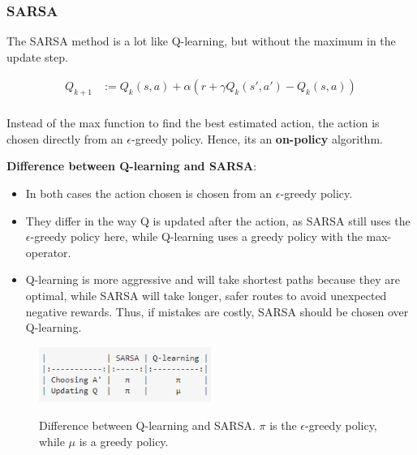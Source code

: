 \subsubsection{SARSA}

The SARSA method is a lot like Q-learning, but without the maximum in the update step.

\begin{align}
    Q_{k+1} &:= Q_k(s, a) + \alpha(r + \gamma Q_k(s', a') - Q_k(s, a)) \\
    \label{eq:qlearn}
\end{align}

Instead of the max function to find the best estimated action, the action is chosen directly from an $\epsilon$-greedy policy. Hence, its an \textbf{on-policy} algorithm.

\textbf{Difference between Q-learning and SARSA}:
\begin{itemize}
    \item In both cases the action chosen is chosen from an $\epsilon$-greedy policy.
    \item They differ in the way Q is updated after the action, as SARSA still uses the $\epsilon$-greedy policy here, while Q-learning uses a greedy policy with the max-operator. 
    \item Q-learning is more aggressive and will take shortest paths because they are optimal, while SARSA will take longer, safer routes to avoid unexpected negative rewards. Thus, if mistakes are costly, SARSA should be chosen over Q-learning.
\end{itemize}

\begin{figure}[h]
    \centering
        \includegraphics[width=0.5\textwidth]{figures/solving/sarsa_q.PNG}\\
        \caption{Difference between Q-learning and SARSA. $\pi$ is the $\epsilon$-greedy policy, while $\mu$ is a greedy policy.}
\end{figure}